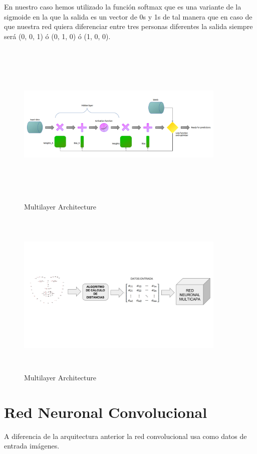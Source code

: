 \documentclass{article}
\begin{document}
En nuestro caso hemos utilizado la función softmax \cite{softmax} que es una variante de la sigmoide en la que la salida es un vector de 0s y 1s de tal manera que en caso de que nuestra red quiera diferenciar entre tres personas diferentes la salida siempre será (0, 0, 1) ó (0, 1, 0) ó (1, 0, 0).
\begin{figure}[H]
  \centering
  \includegraphics[width=100mm, height=80mm]{images/hidden_nn.png}
  \caption{Multilayer Architecture}
\end{figure}

\begin{figure}[H]
  \centering
  \includegraphics[width=100mm, height=80mm]{images/Flowchart.png}
  \caption{Multilayer Architecture}
\end{figure}


\section{Red Neuronal Convolucional}

A diferencia de la arquitectura anterior la red convolucional usa como datos de entrada imágenes.
\end{document}
